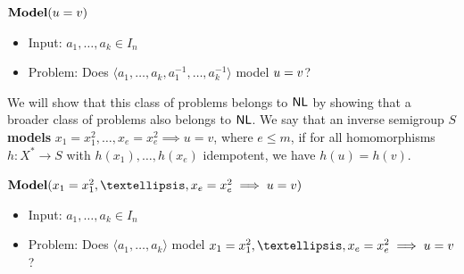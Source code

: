 \documentclass{amsart}
\newcommand{\Modelbf}{\mathbf{Model}}
\newcommand{\eq}{\ensuremath\mathrel{=}}
\newcommand{\NL}{\ensuremath\mathsf{NL}}
\theoremstyle{remark}
\numberwithin{equation}{section}
\begin{document}
\medskip
{$\Modelbf(u \eq v)$}
\begin{itemize}
\item Input: $a_1,\dots,a_k \in I_n$
\item Problem: Does $\langle a_1,\dots,a_k,a_1^{-1},\dots,a_k^{-1} \rangle$ model $u \eq v$?
\end{itemize} 

We will show that this class of problems belongs to $\NL$ by showing that a broader class of problems also belongs to $\NL$. We say that an inverse semigroup $S$ {\bf models} $x_1 = x_1^2,\dots,x_e = x_e^2 \implies u = v$, where $e \leq m$, if for all homomorphisms $h \colon X^* \to S$ with $h(x_1), \dots, h(x_e)$ idempotent, we have $h(u) = h(v)$.

\medskip
{$\Modelbf(x_1 \eq x_1^2,\dots,x_e \eq x_e^2 \implies u \eq v)$}
\begin{itemize}
\item Input: $a_1,\dots,a_k \in I_n$
\item Problem: Does $\langle a_1,\dots,a_k \rangle$ model $x_1 \eq x_1^2,\dots,x_e \eq x_e^2 \implies u \eq v$?
\end{itemize}
\end{document}
